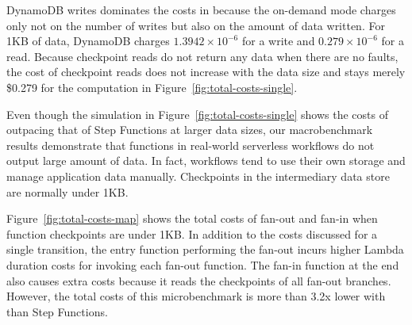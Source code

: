 DynamoDB writes dominates the costs in \name{} because the on-demand mode
charges only not on the number of writes but also on the amount of data
written. For 1KB of data, DynamoDB charges $1.3942 \times 10^{-6}$ for a write
and $0.279 \times 10^{-6}$ for a read. Because checkpoint reads do not return
any data when there are no faults, the cost of checkpoint reads does not
increase with the data size and stays merely \$0.279 for the computation in
Figure~\ref{fig:total-costs-single}.

Even though the simulation in Figure~\ref{fig:total-costs-single} shows the
costs of \name{} outpacing that of Step Functions at larger data sizes, our
macrobenchmark results demonstrate that functions in real-world serverless
workflows do not output large amount of data. In fact, workflows tend to use
their own storage and manage application data manually. Checkpoints in the
\name{} intermediary data store are normally under 1KB.

Figure~\ref{fig:total-costs-map} shows the total costs of fan-out and fan-in
when function checkpoints are under 1KB. In addition to the costs discussed
for a single transition, the entry function performing the fan-out incurs
higher Lambda duration costs for invoking each fan-out function. The fan-in
function at the end also causes extra costs because it reads the checkpoints
of all fan-out branches. However, the total costs of this microbenchmark is
more than 3.2x lower with \name{} than Step Functions.







